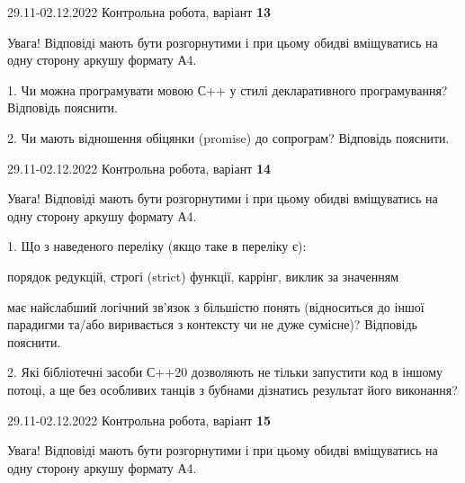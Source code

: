 \documentclass[11pt, ukrainian]{article}
\begin{document}
\vspace{4mm}
\newpage
{29.11-02.12.2022 Контрольна робота, варіант  \No \textbf { 13 }\par}
Увага! Відповіді мають бути розгорнутими і при цьому обидві вміщуватись на одну сторону аркушу формату А4.

{
\begin {large}

1. Чи можна програмувати мовою С++ у стилі декларативного програмування? Відповідь пояснити.%

2. Чи мають відношення обіцянки (promise) до сопрограм? Відповідь пояснити.

\end {large}}

\vspace{4mm}



{29.11-02.12.2022 Контрольна робота, варіант  \No \textbf { 14 }\par}
Увага! Відповіді мають бути розгорнутими і при цьому обидві вміщуватись на одну сторону аркушу формату А4.

{
\begin {large}

1. Що з наведеного переліку (якщо таке в переліку є):

\vspace{4mm}
 порядок редукцій, строгі (strict) функції, каррінг, виклик за значенням

\vspace{4mm}
має найслабший логічний зв’язок з більшістю понять (відноситься до іншої парадигми та/або виривається з контексту чи не дуже сумісне)? Відповідь пояснити.


2. Які бібліотечні засоби С++20 дозволяють не тільки запустити код в іншому потоці, а ще без особливих танців з бубнами дізнатись результат його виконання?

\end {large}}

\vspace{4mm}



{29.11-02.12.2022 Контрольна робота, варіант  \No \textbf { 15 }\par}
Увага! Відповіді мають бути розгорнутими і при цьому обидві вміщуватись на одну сторону аркушу формату А4.
\end{document}
